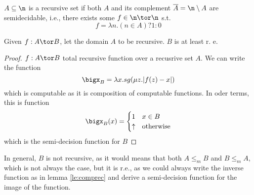\begin{definition}
  \(A\subseteq \n\) is a recursive set if both \(A\) and its
  complement \(\overline{A} = \n \setminus A\) are semidecidable,
  i.e., there exists some \(f \in \n \tor \n\) s.t. \[f = \lambda n
  . (n \in A) ? 1 : 0\]
\end{definition}

\begin{lemma}\label{le:comprec}
  Given \(f : A \tor B\), let the domain \(A\) to be recursive. \(B\)
  is at least r. e.
\end{lemma}

\begin{proof}
  \(f : A \tor B\) total recursive function over a recusrive set
  \(A\). We can write the function \[\bigx_B = \lambda x . sg(\mu z
  . |f(z) - x|)\] which is computable as it is composition of
  computable functions. In oder terms, this is function
  \[\bigx_B(x)
  = \begin{cases}
    1 & x \in B \\
    \uparrow & \text{otherwise}
  \end{cases}\]
  which is the semi-decision function for \(B\)
\end{proof}

\begin{observation}\label{obs:comprec}
  In general, \(B\) is not recursive, as it would means that both \(A
  \leq_m B\) and \(B \leq_m A\), which is not always the case, but it
  is r.e., as we could always write the inverse function as in lemma
  \ref{le:comprec} and derive a semi-decision function for the image
  of the function.
\end{observation}
